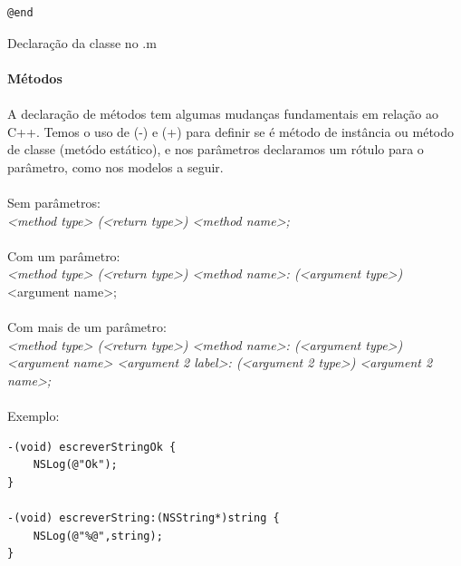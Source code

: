 \documentclass[a4paper,12pt,brazil,doubleside]{book}
\begin{document}
\begin{singlespace}
\begin{listing}
\begin{verbatim}
@end
\end{verbatim}
\caption{Declaração da classe no .m}
\end{listing}

\paragraph{}\textbf{Métodos}

\paragraph{}A declaração de métodos tem algumas mudanças fundamentais em relação ao C++. Temos o uso de (-) e (+) para definir se é método de instância ou método de classe (metódo estático), e nos parâmetros declaramos um rótulo para o parâmetro, como nos modelos a seguir.

\paragraph{}Sem parâmetros:\\
\emph{<method type> (<return type>) <method name>;}

\paragraph{}Com um parâmetro:\\
\emph{<method type> (<return type>) <method name>: (<argument type>)} <argument name>;

\paragraph{}Com mais de um parâmetro:\\
\emph{<method type> (<return type>) <method name>: (<argument type>) <argument name> <argument 2 label>: (<argument 2 type>) <argument 2 name>;}

\paragraph{}Exemplo:

\begin{listing}
\begin{verbatim}
-(void) escreverStringOk {
	NSLog(@"Ok");
}

-(void) escreverString:(NSString*)string {
	NSLog(@"%@",string);
}


\end{verbatim}
\end{listing}
\end{singlespace}
\end{document}
